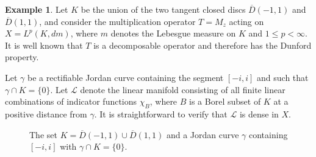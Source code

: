 \documentclass[11pt]{amsart}
\theoremstyle{definition}
\newtheorem{example}[theorem]{Example}
\theoremstyle{remark}
\numberwithin{equation}{section}
\begin{document}
\begin{example}\label{ejemplo normal}
Let $K$ be the union of the two tangent closed discs $\overline{D}(-1,1)$ and
$\overline{D}(1,1)$, and consider the multiplication operator $T=M_z$ acting on
$X=L^p(K,dm)$, where $m$ denotes the Lebesgue measure on $K$ and
$1\le p<\infty$. It is well known that $T$ is a decomposable operator and
therefore has the Dunford property.

Let $\gamma$ be a rectifiable Jordan curve containing the segment $[-i,i]$ and
such that $\gamma\cap K=\{0\}$. Let $\mathcal{L}$ denote the linear manifold
consisting of all finite linear combinations of indicator functions $\chi_B$,
where $B$ is a Borel subset of $K$ at a positive distance from $\gamma$. It is
straightforward to verify that $\mathcal{L}$ is dense in $X$.


\begin{figure}[ht]
\hspace*{1,3cm}
\caption{The set $K=\overline{D}(-1,1)\cup\overline{D}(1,1)$ and a Jordan curve $\gamma$ containing $[-i,i]$ with $\gamma\cap K=\{0\}$.}
\end{figure}


\end{example}
\end{document}
